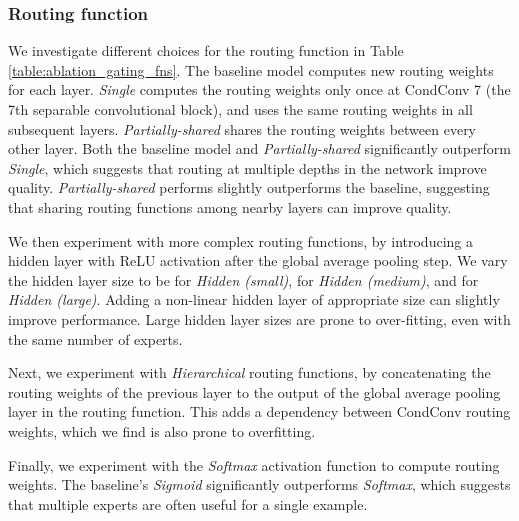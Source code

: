 \documentclass{article}
\def\codename{CondConv}
\begin{document}







\subsubsection{Routing function}

We investigate different choices for the routing function in Table \ref{table:ablation_gating_fns}. The baseline model computes new routing weights for each layer. \textit{Single} computes the routing weights only once at \codename{} 7 (the 7th separable convolutional block), and uses the same routing weights in all subsequent layers. \textit{Partially-shared} shares the routing weights between every other layer. Both the baseline model and \emph{Partially-shared} significantly outperform \emph{Single}, which suggests that routing at multiple depths in the network improve quality. \emph{Partially-shared} performs slightly outperforms the baseline, suggesting that sharing routing functions among nearby layers can improve quality.

We then experiment with more complex routing functions, by introducing a hidden layer with ReLU activation after the global average pooling step. We vary the hidden layer size to be  for \textit{Hidden (small)},  for \textit{Hidden (medium)}, and  for \textit{Hidden (large)}. Adding a non-linear hidden layer of appropriate size can slightly improve performance. Large hidden layer sizes are prone to over-fitting, even with the same number of experts.

Next, we experiment with \textit{Hierarchical} routing functions, by concatenating the routing weights of the previous layer to the output of the global average pooling layer in the routing function. This adds a dependency between \codename{} routing weights, which we find is also prone to overfitting.

Finally, we experiment with the \textit{Softmax} activation function to compute routing weights. The baseline's \textit{Sigmoid} significantly outperforms \textit{Softmax}, which suggests that multiple experts are often useful for a single example.
\end{document}

